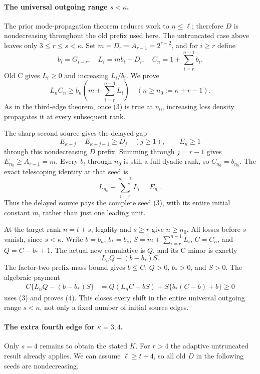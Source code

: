 \paragraph{The universal outgoing range $s<\kappa$.}
The prior mode-propagation theorem reduces work to $n\le\ell$;
therefore $D$ is nondecreasing throughout the old prefix used here.
The untruncated case above leaves only $3\le r\le s<\kappa$.
Set $m=D_r=A_{r-1}=2^{r-2}$, and for $i\ge r$ define
\[
 b_i=G_{i-r},\quad L_i=mb_i-D_i,\quad
 C_n=1+\sum_{i=r}^{n-1}b_i.
\]
Old C gives $L_i\ge0$ and increasing $L_i/b_i$.
We prove
\[
 L_nC_n\ge b_n\left(m+\sum_{i=r}^{n-1}L_i\right)
                       \quad(n\ge n_0:=\kappa+r-1).           \tag{3}
\]
As in the third-edge theorem, once (3) is true at $n_0$,
increasing loss density propagates it at every subsequent rank.

The sharp second source gives the delayed gap
\[
 E_{\kappa+j}-E_{\kappa+j-1}\ge D_j\quad(j\ge1),\qquad
 E_\kappa\ge1
\]
through this nondecreasing $D$ prefix. Summing through $j=r-1$
gives $E_{n_0}\ge A_{r-1}=m$. Every $b_i$ through $n_0$
is still a full dyadic rank, so $C_{n_0}=b_{n_0}$.
The exact telescoping identity at that seed is
\[
        L_{n_0}-\sum_{i=r}^{n_0-1}L_i=E_{n_0}.
\]
Thus the delayed source pays the complete seed (3), with its
entire initial constant $m$, rather than just one leading unit.

At the target rank $n=t+s$, legality and $s\ge r$ give
$n\ge n_0$. All losses before $s$ vanish, since $s<\kappa$.
Write $b=b_n$, $b_*=b_s$, $S=m+\sum_{i=r}^{n-1}L_i$,
$C=C_n$, and $Q=C-b_*+1$. The actual new cumulative is $Q$,
and its C minor is exactly
\[
                          L_nQ-(b-b_*)S.                     \tag{4}
\]
The factor-two prefix-mass bound gives $b\le C$; $Q>0$,
$b_*>0$, and $S>0$. The algebraic payment
\[
 \begin{split}
 C\{L_nQ-(b-b_*)S\}
 &=Q(L_nC-bS)+S\{b_*(C-b)+b\}\ge0
 \end{split}                                                 \tag{5}
\]
uses (3) and proves (4). This closes every shift in the entire
universal outgoing range $s<\kappa$, not only a fixed number
of initial source edges.

\paragraph{The extra fourth edge for $\kappa=3,4$.}
Only $s=4$ remains to obtain the stated $K$.
For $r>4$ the adaptive untruncated result already applies.
We can assume $\ell\ge t+4$, so all old $D$ in the following
seeds are nondecreasing.


